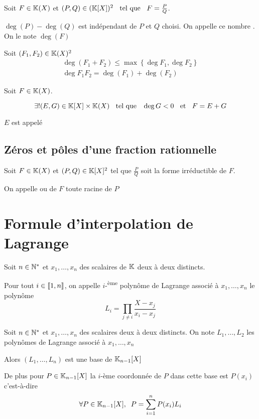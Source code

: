 \begin{dfn}
  Soit $F \in \mathbb{K}(X)$ et $(P, Q) \in (\mathbb{K}[X])^2 \;\;\text{ tel que }\;\; F = \frac{P}{Q}$.

  $\deg(P) - \deg(Q)$ est indépendant de $P$ et $Q$ choisi. On appelle
  ce nombre . On le note $\deg(F)$
\end{dfn}

\begin{prp}
  Soit $(F_1, F_2) \in \mathbb{K}(X)^2$
  \begin{gather*}
    \deg(F_1 + F_2) \leq \max\left\{\deg F_1, \deg F_2 \right\} \\
    \deg F_1 F_2 = \deg (F_1) + \deg (F_2)
  \end{gather*}
\end{prp}

\begin{prp}
  Soit $F \in \mathbb{K}(X)$.

  \[
    \exists! (E, G) \in \mathbb{K}[X] \times \mathbb{K}(X) \;\;\text{ tel que }\;\; \deg G < 0 \;\;\text{ et }\;\; F = E + G
  \]

  $E$ est appelé 
\end{prp}

\subsection{Zéros et pôles d'une fraction rationnelle}

\begin{dfn}
  Soit $F \in \mathbb{K}(X)$ et $(P, Q) \in \mathbb{K}[X]^2$ tel que $\frac{P}{Q}$
  soit la forme irréductible de $F$.

  On appelle  ou  de $F$ toute racine de $P$
\end{dfn}

\section{Formule d'interpolation de Lagrange}

\begin{dfn}
Soit $n \in \mathbb{N}^*$ et $x_1, \ldots, x_n$ des scalaires de $\mathbb{K}$ deux à deux
distincts.

Pour tout $i \in \llbracket 1, n \rrbracket$, on appelle $i$-\textsuperscript{ème}
polynôme de Lagrange associé à $x_1, \ldots, x_n$ le polynôme
\[
    L_i = \prod_{j \neq i} \frac{X - x_j}{x_i - x_j}
\]
\end{dfn}

\begin{prp}
Soit $n \in \mathbb{N}^*$ et $x_1, \ldots, x_n$ des scalaires deux à deux
distincts.
On note $L_1, \ldots, L_2$ les polynômes de Lagrange associé à
$x_1, \ldots, x_n$ 

Alors $(L_1, \ldots, L_n)$ est une base de $\mathbb{K}_{n - 1}[X]$

De plus pour $P \in \mathbb{K}_{n - 1}[X]$ la $i$-ème coordonnée
de $P$ dans cette base est $P(x_i)$ c'est-à-dire
\[
    \forall P \in \mathbb{K}_{n - 1}[X], \;\; P = \sum^n_{i = 1} P(x_i) L_i
\]
\end{prp}

